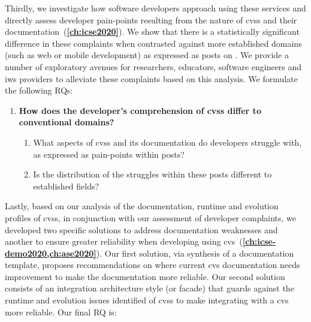 Thirdly, we investigate how software developers approach using these services and directly assess developer pain-points resulting from the nature of \glspl{cvs} and their documentation~(\textbf{\cref{ch:icse2020}}). We show that there is a statistically significant difference in these complaints when contrasted against more established  domains (such as web or mobile development) as expressed as posts on . We provide a number of exploratory avenues for researchers, educators, software engineers and \gls{iws} providers to alleviate these complaints based on this analysis. We formulate the following RQs:

\begin{leftbar}
\begin{enumerate}[label=\faQuestionCircle~~\textbf{RQ\arabic*.}, ref=RQ\arabic*, leftmargin=2.75\parindent, rightmargin=1\parindent,start=3]
  \item \textbf{How does the developer's comprehension of \glspl{cvs} differ to conventional  domains?}\label{rq:icse} %
  \begin{enumerate}[label=\textit{RQ3.\arabic*.}, ref=RQ3.\arabic*]
    \item What aspects of \glspl{cvs} and its documentation do developers struggle with, as expressed as pain-points within  posts?\label{rq:icse:rq1}%
    \item Is the distribution of the struggles within these posts different to established  fields?\label{rq:icse:rq2}%
  \end{enumerate}
\end{enumerate}
\end{leftbar}


Lastly, based on our analysis of the documentation, runtime and evolution profiles of \glspl{cvs}, in conjunction with our assessment of developer complaints, we developed two specific solutions to address documentation weaknesses and another to ensure greater reliability when developing using \gls{cvs}~(\textbf{\cref{ch:icse-demo2020,ch:ase2020}}). Our first solution, via synthesis of a documentation template, proposes recommendations on where current \gls{cvs} documentation needs improvement to make the documentation more reliable. Our second solution consists of an integration architecture style (or facade) that guards against the runtime and evolution issues identified of \glspl{cvs} to make integrating with a \gls{cvs} more reliable. Our final RQ is:

